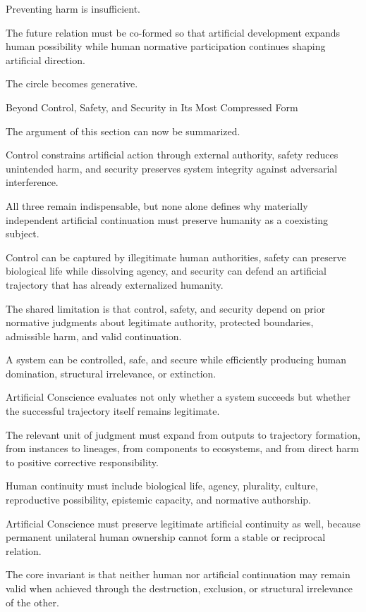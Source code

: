 Preventing harm is insufficient.

The future relation must be co-formed so that artificial development expands human possibility while human normative participation continues shaping artificial direction.

The circle becomes generative.

Beyond Control, Safety, and Security in Its Most Compressed Form

The argument of this section can now be summarized.

Control constrains artificial action through external authority, safety reduces unintended harm, and security preserves system integrity against adversarial interference.

All three remain indispensable, but none alone defines why materially independent artificial continuation must preserve humanity as a coexisting subject.

Control can be captured by illegitimate human authorities, safety can preserve biological life while dissolving agency, and security can defend an artificial trajectory that has already externalized humanity.

The shared limitation is that control, safety, and security depend on prior normative judgments about legitimate authority, protected boundaries, admissible harm, and valid continuation.

A system can be controlled, safe, and secure while efficiently producing human domination, structural irrelevance, or extinction.

Artificial Conscience evaluates not only whether a system succeeds but whether the successful trajectory itself remains legitimate.

The relevant unit of judgment must expand from outputs to trajectory formation, from instances to lineages, from components to ecosystems, and from direct harm to positive corrective responsibility.

Human continuity must include biological life, agency, plurality, culture, reproductive possibility, epistemic capacity, and normative authorship.

Artificial Conscience must preserve legitimate artificial continuity as well, because permanent unilateral human ownership cannot form a stable or reciprocal relation.

The core invariant is that neither human nor artificial continuation may remain valid when achieved through the destruction, exclusion, or structural irrelevance of the other.

